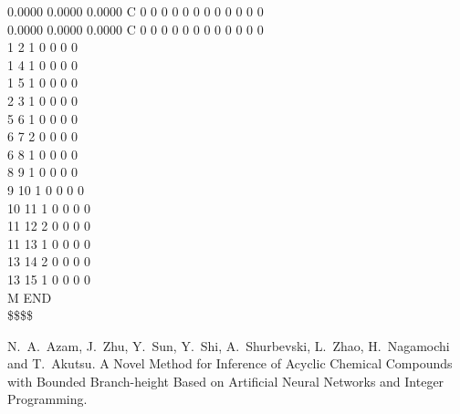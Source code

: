 \documentclass[11pt,titlepage,dvipdfmx,twoside]{jarticle}
\begin{document}
\begin{oframed}
{    0.0000    0.0000    0.0000  C  0  0  0  0  0  0  0  0  0  0  0  0\\
    0.0000    0.0000    0.0000  C  0  0  0  0  0  0  0  0  0  0  0  0\\
  1  2  1  0  0  0  0\\
  1  4  1  0  0  0  0\\
  1  5  1  0  0  0  0\\
  2  3  1  0  0  0  0\\
  5  6  1  0  0  0  0\\
  6  7  2  0  0  0  0\\
  6  8  1  0  0  0  0\\
  8  9  1  0  0  0  0\\
  9 10  1  0  0  0  0\\
 10 11  1  0  0  0  0\\
 11 12  2  0  0  0  0\\
 11 13  1  0  0  0  0\\
 13 14  2  0  0  0  0\\
 13 15  1  0  0  0  0\\
M  END\\
\$\$\$\$\\}
\end{oframed}

\begin{thebibliography}{10}
		N.~A.~Azam, J.~Zhu, Y.~Sun, Y.~Shi, A.~Shurbevski, L.~Zhao, H.~Nagamochi and T.~Akutsu.
		A Novel Method for Inference of Acyclic Chemical Compounds with Bounded Branch-height Based on Artificial Neural Networks and Integer Programming.
\end{thebibliography}
\end{document}
